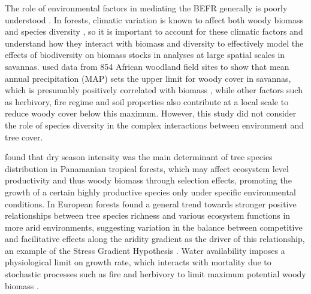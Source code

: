 \documentclass[11pt,a4paper]{article}
\begin{document}
The role of environmental factors in mediating the BEFR generally is poorly understood \citep{Ratcliffe2017}. In forests, climatic variation is known to affect both woody biomass \citep{Michaletz2014} and species diversity \citep{}, so it is important to account for these climatic factors and understand how they interact with biomass and diversity to effectively model the effects of biodiversity on biomass stocks in analyses at large spatial scales in savannas. \citet{Sankaran2005} used data from 854 African woodland field sites to show that mean annual precipitation (MAP) sets the upper limit for woody cover in savannas, which is presumably positively correlated with biomass \citep{}, while other factors such as herbivory, fire regime and soil properties also contribute at a local scale to reduce woody cover below this maximum. However, this study did not consider the role of species diversity in the complex interactions between environment and tree cover. 

\citet{Condit2013} found that dry season intensity was the main determinant of tree species distribution in Panamanian tropical forests, which may affect ecosystem level productivity and thus woody biomass through selection effects, promoting the growth of a certain highly productive species only under specific environmental conditions. In European forests \citep{Ratcliffe2017} found a general trend towards stronger positive relationships between tree species richness and various ecosystem functions in more arid environments, suggesting variation in the balance between competitive and facilitative effects along the aridity gradient as the driver of this relationship, an example of the Stress Gradient Hypothesis \citep{Dohn2013}. Water availability imposes a physiological limit on growth rate, which interacts with mortality due to stochastic processes such as fire and herbivory to limit maximum potential woody biomass \citep{}. 
\end{document}
